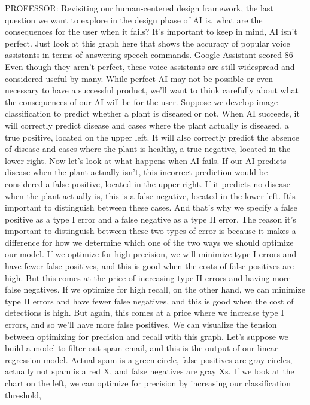 PROFESSOR: Revisiting our human-centered design framework,
the last question we want to explore in the design phase of AI
is, what are the consequences for the user when it fails?
It's important to keep in mind, AI isn't perfect.
Just look at this graph here that shows the accuracy of popular voice
assistants in terms of answering speech commands.
Google Assistant scored 86%
Even though they aren't perfect, these voice assistants
are still widespread and considered useful by many.
While perfect AI may not be possible or even
necessary to have a successful product, we'll
want to think carefully about what the consequences of our AI
will be for the user.
Suppose we develop image classification to predict whether a plant is diseased
or not.
When AI succeeds, it will correctly predict disease and cases
where the plant actually is diseased, a true positive, located
on the upper left.
It will also correctly predict the absence of disease
and cases where the plant is healthy, a true negative,
located in the lower right.
Now let's look at what happens when AI fails.
If our AI predicts disease when the plant actually
isn't, this incorrect prediction would be considered a false positive, located
in the upper right.
If it predicts no disease when the plant actually is,
this is a false negative, located in the lower left.
It's important to distinguish between these cases.
And that's why we specify a false positive as a type I
error and a false negative as a type II error.
The reason it's important to distinguish between these two types of error
is because it makes a difference for how we determine which one of the two ways
we should optimize our model.
If we optimize for high precision, we will minimize type I errors
and have fewer false positives, and this is good
when the costs of false positives are high.
But this comes at the price of increasing type II errors
and having more false negatives.
If we optimize for high recall, on the other hand,
we can minimize type II errors and have fewer false negatives,
and this is good when the cost of detections is high.
But again, this comes at a price where we increase type I errors,
and so we'll have more false positives.
We can visualize the tension between optimizing for precision
and recall with this graph.
Let's suppose we build a model to filter out spam email,
and this is the output of our linear regression model.
Actual spam is a green circle, false positives are gray circles,
actually not spam is a red X, and false negatives are gray Xs.
If we look at the chart on the left, we can
optimize for precision by increasing our classification threshold,
